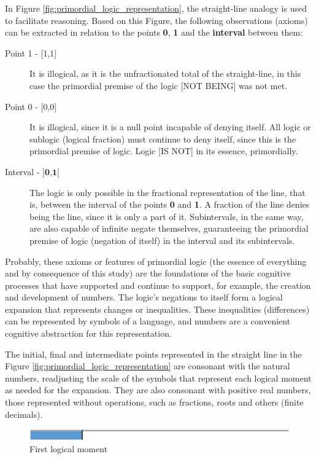 In Figure \ref{fig:primordial_logic_representation}, the straight-line analogy is used to facilitate reasoning. Based on this Figure, the following observations (axioms) can be extracted in relation to the points \textbf {0}, \textbf {1} and the \textbf{interval} between them:
	\begin{description}
	   \item[Point 1 - {[1,1]}] It is illogical, as it is the unfractionated total of the straight-line, in this case the primordial premise of the logic [NOT BEING] was not met. 
	   \item[Point 0 - {[0,0]}] It is illogical, since it is a null point incapable of denying itself. All logic or sublogic (logical fraction) must continue to deny itself, since this is the primordial premise of logic. Logic [IS NOT] in its essence, primordially.
	   \item[Interval - $\textbf{{]0,1[}}$] The logic is only possible in the fractional representation of the line, that is, between the interval of the points \textbf{0} and \textbf{1}. A fraction of the line denies being the line, since it is only a part of it. Subintervals, in the same way, are also capable of infinite negate themselves, guaranteeing the primordial premise of logic (negation of itself) in the interval and its subintervals.
	\end{description}

Probably, these axioms or features of primordial logic (the essence of everything and by consequence of this study) are the foundations of the basic cognitive processes that have supported and continue to support, for example, the creation and development of numbers. The logic's negations to itself form a logical expansion that represents changes or inequalities. These inequalities (differences) can be represented by symbols of a language, and numbers are a convenient cognitive abstraction for this representation.

The initial, final and intermediate points represented in the straight line in the Figure \ref{fig:primordial_logic_representation} are consonant with the natural numbers, readjusting the scale of the symbols that represent each logical moment as needed for the expansion. They are also consonant with positive real numbers, those represented without operations, such as fractions, roots and others (finite decimals).
	\begin{figure}[H]
	\caption{First logical moment}
	\label{fig:first_logical_moment}
	\centering
	\includegraphics[scale=.87]{sections/images/first_logical_moment.jpg}
	\end{figure}

